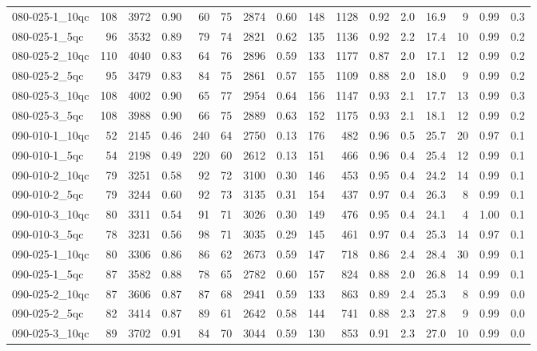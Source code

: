 \documentclass[twoside]{article}
\begin{document}
\begin{longtable}{l|rrrr|rrrr|rrr|rrrr}
		080-025-1\_10qc & 108 & 3972 & 0.90 & 60 & 75 & 2874 & 0.60 & 148 & 1128 & 0.92 & 2.0 & 16.9 & 9 & 0.99 & 0.3 \\
		080-025-1\_5qc & 96 & 3532 & 0.89 & 79 & 74 & 2821 & 0.62 & 135 & 1136 & 0.92 & 2.2 & 17.4 & 10 & 0.99 & 0.2 \\
		080-025-2\_10qc & 110 & 4040 & 0.83 & 64 & 76 & 2896 & 0.59 & 133 & 1177 & 0.87 & 2.0 & 17.1 & 12 & 0.99 & 0.2 \\
		080-025-2\_5qc & 95 & 3479 & 0.83 & 84 & 75 & 2861 & 0.57 & 155 & 1109 & 0.88 & 2.0 & 18.0 & 9 & 0.99 & 0.2 \\
		080-025-3\_10qc & 108 & 4002 & 0.90 & 65 & 77 & 2954 & 0.64 & 156 & 1147 & 0.93 & 2.1 & 17.7 & 13 & 0.99 & 0.3 \\
		080-025-3\_5qc & 108 & 3988 & 0.90 & 66 & 75 & 2889 & 0.63 & 152 & 1175 & 0.93 & 2.1 & 18.1 & 12 & 0.99 & 0.2 \\
		090-010-1\_10qc & 52 & 2145 & 0.46 & 240 & 64 & 2750 & 0.13 & 176 & 482 & 0.96 & 0.5 & 25.7 & 20 & 0.97 & 0.1 \\
		090-010-1\_5qc & 54 & 2198 & 0.49 & 220 & 60 & 2612 & 0.13 & 151 & 466 & 0.96 & 0.4 & 25.4 & 12 & 0.99 & 0.1 \\
		090-010-2\_10qc & 79 & 3251 & 0.58 & 92 & 72 & 3100 & 0.30 & 146 & 453 & 0.95 & 0.4 & 24.2 & 14 & 0.99 & 0.1 \\
		090-010-2\_5qc & 79 & 3244 & 0.60 & 92 & 73 & 3135 & 0.31 & 154 & 437 & 0.97 & 0.4 & 26.3 & 8 & 0.99 & 0.1 \\
		090-010-3\_10qc & 80 & 3311 & 0.54 & 91 & 71 & 3026 & 0.30 & 149 & 476 & 0.95 & 0.4 & 24.1 & 4 & 1.00 & 0.1 \\
		090-010-3\_5qc & 78 & 3231 & 0.56 & 98 & 71 & 3035 & 0.29 & 145 & 461 & 0.97 & 0.4 & 25.3 & 14 & 0.97 & 0.1 \\
		090-025-1\_10qc & 80 & 3306 & 0.86 & 86 & 62 & 2673 & 0.59 & 147 & 718 & 0.86 & 2.4 & 28.4 & 30 & 0.99 & 0.1 \\
		090-025-1\_5qc & 87 & 3582 & 0.88 & 78 & 65 & 2782 & 0.60 & 157 & 824 & 0.88 & 2.0 & 26.8 & 14 & 0.99 & 0.1 \\
		090-025-2\_10qc & 87 & 3606 & 0.87 & 87 & 68 & 2941 & 0.59 & 133 & 863 & 0.89 & 2.4 & 25.3 & 8 & 0.99 & 0.0 \\
		090-025-2\_5qc & 82 & 3414 & 0.87 & 89 & 61 & 2642 & 0.58 & 144 & 741 & 0.88 & 2.3 & 27.8 & 9 & 0.99 & 0.0 \\
		090-025-3\_10qc & 89 & 3702 & 0.91 & 84 & 70 & 3044 & 0.59 & 130 & 853 & 0.91 & 2.3 & 27.0 & 10 & 0.99 & 0.0 \\

\end{longtable}
\end{document}
